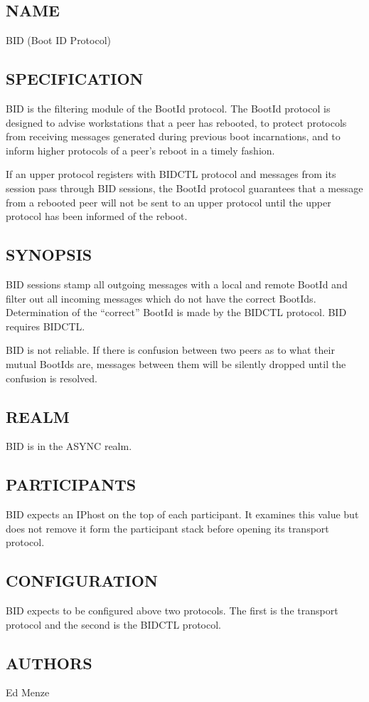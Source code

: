 %
%
%

\subsection*{NAME}

\noindent BID (Boot ID Protocol)

\subsection*{SPECIFICATION}

\noindent 

BID is the filtering module of the BootId protocol. 
The BootId protocol is designed to advise workstations that a peer has
rebooted, to protect protocols from receiving messages generated
during previous boot incarnations, and to inform higher protocols of a
peer's reboot in a timely fashion.

If an upper protocol registers with BIDCTL protocol and messages
from its session pass through BID sessions, the BootId protocol
guarantees that a message from a rebooted peer will not be sent to an
upper protocol until the upper protocol has been informed of the
reboot.  

\subsection*{SYNOPSIS}

BID sessions stamp all outgoing messages with a local and remote
BootId and filter out all incoming messages which do not have the
correct BootIds.  Determination of the ``correct'' BootId is made by
the BIDCTL protocol.  BID requires BIDCTL.

BID is not reliable.  If there is confusion between two peers as to
what their mutual BootIds are, messages between them will be silently
dropped until the confusion is resolved.

\subsection*{REALM}

BID is in the ASYNC realm.

\subsection*{PARTICIPANTS}

BID expects an IPhost on the top of each participant.  It examines
this value but does not remove it form the participant stack before
opening its transport protocol.

\subsection*{CONFIGURATION}

BID expects to be configured above two protocols.  The first is the
transport protocol and the second is the BIDCTL protocol.

\subsection*{AUTHORS}

\noindent Ed Menze

